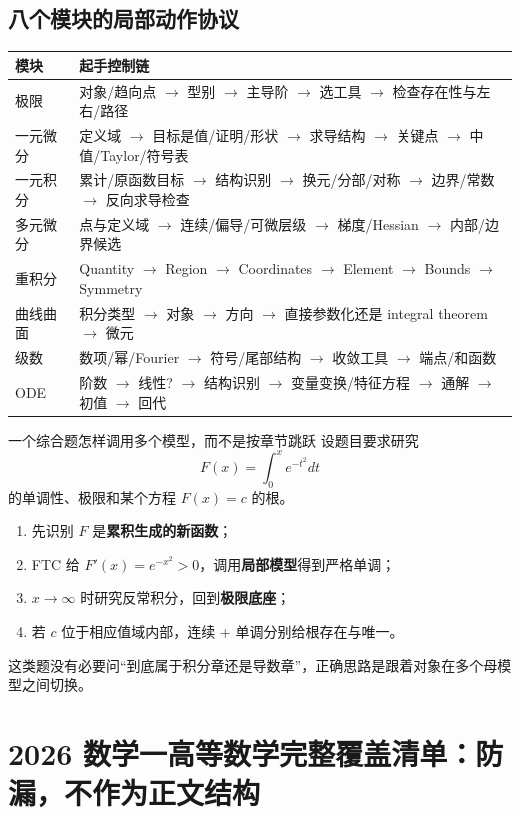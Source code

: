\documentclass[11pt,a4paper,openany]{ctexbook}
\newcommand{\key}[1]{\textbf{\color{deep}#1}}
\begin{document}
\section{八个模块的局部动作协议}
\begin{longtable}{L{2.6cm}L{\dimexpr\linewidth-2.77cm\relax}}
\toprule
\textbf{模块} & \textbf{起手控制链}\\
\midrule
极限 & 对象/趋向点 $\to$ 型别 $\to$ 主导阶 $\to$ 选工具 $\to$ 检查存在性与左右/路径\\
一元微分 & 定义域 $\to$ 目标是值/证明/形状 $\to$ 求导结构 $\to$ 关键点 $\to$ 中值/Taylor/符号表\\
一元积分 & 累计/原函数目标 $\to$ 结构识别 $\to$ 换元/分部/对称 $\to$ 边界/常数 $\to$ 反向求导检查\\
多元微分 & 点与定义域 $\to$ 连续/偏导/可微层级 $\to$ 梯度/Hessian $\to$ 内部/边界候选\\
重积分 & Quantity $\to$ Region $\to$ Coordinates $\to$ Element $\to$ Bounds $\to$ Symmetry\\
曲线曲面 & 积分类型 $\to$ 对象 $\to$ 方向 $\to$ 直接参数化还是 integral theorem $\to$ 微元\\
级数 & 数项/幂/Fourier $\to$ 符号/尾部结构 $\to$ 收敛工具 $\to$ 端点/和函数\\
ODE & 阶数 $\to$ 线性? $\to$ 结构识别 $\to$ 变量变换/特征方程 $\to$ 通解 $\to$ 初值 $\to$ 回代\\
\bottomrule
\end{longtable}

\begin{examplebox}{一个综合题怎样调用多个模型，而不是按章节跳跃}
设题目要求研究
\[
F(x)=\int_0^x e^{-t^2}dt
\]
的单调性、极限和某个方程 $F(x)=c$ 的根。
\begin{enumerate}
  \item 先识别 $F$ 是\key{累积生成的新函数}；
  \item FTC 给 $F'(x)=e^{-x^2}>0$，调用\key{局部模型}得到严格单调；
  \item $x\to\infty$ 时研究反常积分，回到\key{极限底座}；
  \item 若 $c$ 位于相应值域内部，连续 + 单调分别给根存在与唯一。
\end{enumerate}
这类题没有必要问“到底属于积分章还是导数章”，正确思路是跟着对象在多个母模型之间切换。
\end{examplebox}

\appendix
\chapter{2026 数学一高等数学完整覆盖清单：防漏，不作为正文结构}
\end{document}
